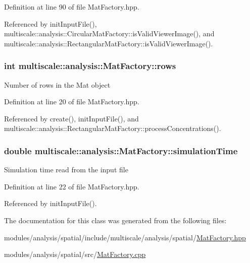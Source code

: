 Definition at line 90 of file Mat\-Factory.\-hpp.



Referenced by init\-Input\-File(), multiscale\-::analysis\-::\-Circular\-Mat\-Factory\-::is\-Valid\-Viewer\-Image(), and multiscale\-::analysis\-::\-Rectangular\-Mat\-Factory\-::is\-Valid\-Viewer\-Image().

\hypertarget{classmultiscale_1_1analysis_1_1MatFactory_a35672fb0c992f662018ee7c146794474}{
\subsubsection[{rows}]{\setlength{\rightskip}{0pt plus 5cm}int multiscale\-::analysis\-::\-Mat\-Factory\-::rows\hspace{0.3cm}{\ttfamily [protected]}}}\label{classmultiscale_1_1analysis_1_1MatFactory_a35672fb0c992f662018ee7c146794474}
Number of rows in the Mat object 

Definition at line 20 of file Mat\-Factory.\-hpp.



Referenced by create(), init\-Input\-File(), and multiscale\-::analysis\-::\-Rectangular\-Mat\-Factory\-::process\-Concentrations().

\hypertarget{classmultiscale_1_1analysis_1_1MatFactory_a99caa620805ac50375699236d83fbd96}{
\subsubsection[{simulation\-Time}]{\setlength{\rightskip}{0pt plus 5cm}double multiscale\-::analysis\-::\-Mat\-Factory\-::simulation\-Time\hspace{0.3cm}{\ttfamily [protected]}}}\label{classmultiscale_1_1analysis_1_1MatFactory_a99caa620805ac50375699236d83fbd96}
Simulation time read from the input file 

Definition at line 22 of file Mat\-Factory.\-hpp.



Referenced by init\-Input\-File().



The documentation for this class was generated from the following files\-:\begin{DoxyCompactItemize}
\item 
modules/analysis/spatial/include/multiscale/analysis/spatial/\hyperlink{MatFactory_8hpp}{Mat\-Factory.\-hpp}\item 
modules/analysis/spatial/src/\hyperlink{MatFactory_8cpp}{Mat\-Factory.\-cpp}\end{DoxyCompactItemize}
